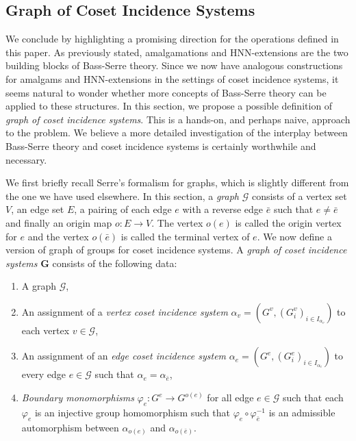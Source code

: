 \documentclass[11pt,letterpaper]{amsart}
\begin{document}
\subsection{Graph of Coset Incidence Systems}\label{subsec:graphofcosetgeom}

We conclude by highlighting a promising direction for the operations defined in this paper.
As previously stated, amalgamations and HNN-extensions are the two building blocks of Bass-Serre theory. Since we now have analogous constructions for amalgams and HNN-extensions in the settings of coset incidence systems, it seems natural to wonder whether more concepts of Bass-Serre theory can be applied to these structures. In this section, we propose a possible definition of \textit{graph of coset incidence systems}. This is a hands-on, and perhaps naive, approach to the problem. We believe a more detailed investigation of the interplay between Bass-Serre theory and coset incidence systems is certainly worthwhile and necessary.

We first briefly recall Serre's formalism for graphs, which is slightly different from the one we have used elsewhere. In this section, a \textit{graph} $\mathcal{G}$ consists of a vertex set $V$, an edge set $E$, a pairing of each edge $e$ with a reverse edge $\bar{e}$ such that $e \neq \bar{e}$ and finally an origin map $o \colon E \to V$. The vertex $o(e)$ is called the origin vertex for $e$ and the vertex $o(\bar{e})$ is called the terminal vertex of $e$. We now define a version of graph of groups for coset incidence systems. A \textit{graph of coset incidence systems} $\mathbf{G}$ consists of the following data:

\begin{enumerate}
    \item A graph $\mathcal{G}$,
    \item An assignment of a \textit{vertex coset incidence system} $\alpha_v = (G^v, (G^v_i)_{i \in I_{\alpha_v}})$ to each vertex $v \in \mathcal{G}$,
    \item An assignment of an \textit{edge coset incidence system} $\alpha_e = (G^e, (G^e_i)_{i \in I_{\alpha_e}})$ to every edge $e \in \mathcal{G}$ such that $\alpha_e = \alpha_{\bar{e}}$,
    \item \textit{Boundary monomorphisms} $\varphi_e \colon G^e \to G^{o(e)}$ for all edge $e \in \mathcal{G}$ such that each $\varphi_e$ is an injective group homomorphism such that $\varphi_e \circ \varphi_{\bar{e}}^{-1}$ is an admissible automorphism between $\alpha_{o(e)}$ and $\alpha_{o(\bar{e})}$.
\end{enumerate}
\end{document}
